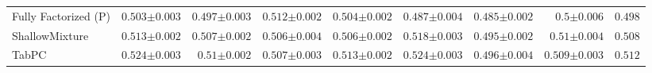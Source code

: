 \begin{tabular}{lrrrrrrr|r}
    Fully Factorized (P) & $0.503${\tiny${\pm 0.003}$} & $0.497${\tiny${\pm 0.003}$} & $0.512${\tiny${\pm 0.002}$} & $0.504${\tiny${\pm 0.002}$} & $0.487${\tiny${\pm 0.004}$} & $0.485${\tiny${\pm 0.002}$} & $0.5${\tiny${\pm 0.006}$} & $0.498$ \\
    ShallowMixture & $0.513${\tiny${\pm 0.002}$} & $0.507${\tiny${\pm 0.002}$} & $0.506${\tiny${\pm 0.004}$} & $0.506${\tiny${\pm 0.002}$} & $0.518${\tiny${\pm 0.003}$} & $0.495${\tiny${\pm 0.002}$} & $0.51${\tiny${\pm 0.004}$} & $0.508$ \\
    TabPC & $0.524${\tiny${\pm 0.003}$} & $0.51${\tiny${\pm 0.002}$} & $0.507${\tiny${\pm 0.003}$} & $0.513${\tiny${\pm 0.002}$} & $0.524${\tiny${\pm 0.003}$} & $0.496${\tiny${\pm 0.004}$} & $0.509${\tiny${\pm 0.003}$} & $0.512$ \\
    \bottomrule[1.0pt]
\end{tabular}